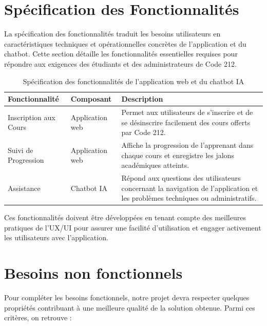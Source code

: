 \documentclass[a4paper, 11pt, openany]{report}
\begin{document}


\section{Spécification des Fonctionnalités}
La spécification des fonctionnalités traduit les besoins utilisateurs en caractéristiques techniques et opérationnelles concrètes de l'application et du chatbot. Cette section détaille les fonctionnalités essentielles requises pour répondre aux exigences des étudiants et des administrateurs de Code 212.

\begin{table}[htp]
\caption{Spécification des fonctionnalités de l'application web et du chatbot IA}
\centering
\begin{tabular}{|m{4cm}|m{5cm}|m{7cm}|}
\hline
\textbf{Fonctionnalité} & \textbf{Composant} & \textbf{Description} \\ \hline
Inscription aux Cours & Application web & Permet aux utilisateurs de s'inscrire et de se désinscrire facilement des cours offerts par Code 212. \\ \hline
Suivi de Progression & Application web & Affiche la progression de l'apprenant dans chaque cours et enregistre les jalons académiques atteints. \\ \hline
Assistance & Chatbot IA & Répond aux questions des utilisateurs concernant la navigation de l'application et les problèmes techniques ou administratifs. \\ \hline
\end{tabular}
\label{tab:functional_specs}
\end{table}

Ces fonctionnalités doivent être développées en tenant compte des meilleures pratiques de l'UX/UI pour assurer une facilité d'utilisation et engager activement les utilisateurs avec l'application.

\section{Besoins non fonctionnels}

Pour compléter les besoins fonctionnels, notre projet devra respecter quelques propriétés contribuant à une meilleure qualité de la solution obtenue. Parmi ces critères, on retrouve :
\end{document}
